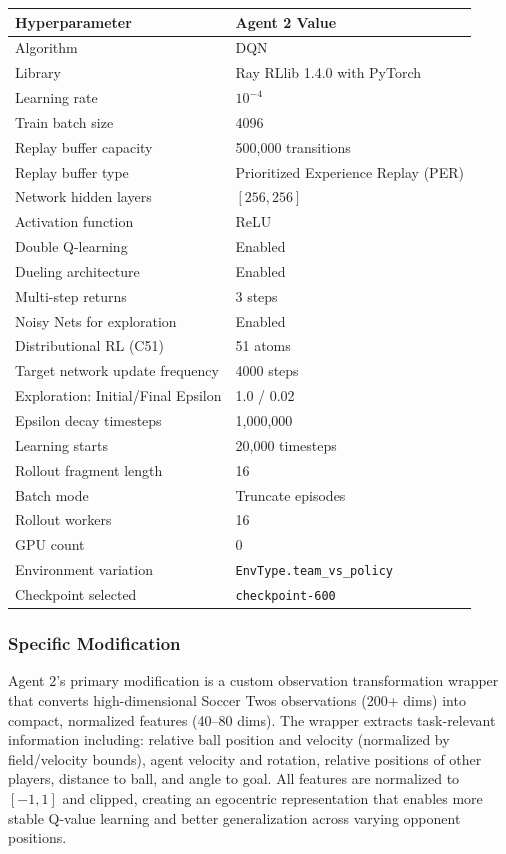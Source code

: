 \documentclass{article}
\begin{document}
\begin{center}
\begin{tabular}{|l|l|}
\hline
\textbf{Hyperparameter} & \textbf{Agent 2 Value} \\
\hline
Algorithm & DQN \\
\hline
Library & Ray RLlib 1.4.0 with PyTorch \\
\hline
Learning rate & $10^{-4}$ \\
\hline
Train batch size & 4096 \\
\hline
Replay buffer capacity & 500,000 transitions \\
\hline
Replay buffer type & Prioritized Experience Replay (PER) \\
\hline
Network hidden layers & $[256, 256]$ \\
\hline
Activation function & ReLU \\
\hline
Double Q-learning & Enabled \\
\hline
Dueling architecture & Enabled \\
\hline
Multi-step returns & 3 steps \\
\hline
Noisy Nets for exploration & Enabled \\
\hline
Distributional RL (C51) & 51 atoms \\
\hline
Target network update frequency & 4000 steps \\
\hline
Exploration: Initial/Final Epsilon & 1.0 / 0.02 \\
\hline
Epsilon decay timesteps & 1,000,000 \\
\hline
Learning starts & 20,000 timesteps \\
\hline
Rollout fragment length & 16 \\
\hline
Batch mode & Truncate episodes \\
\hline
Rollout workers & 16 \\
\hline
GPU count & 0 \\
\hline
Environment variation & \texttt{EnvType.team\_vs\_policy} \\
\hline
Checkpoint selected & \texttt{checkpoint-600} \\
\hline
\end{tabular}
\end{center}

\subsubsection{Specific Modification}

Agent 2's primary modification is a custom observation transformation wrapper that converts high-dimensional Soccer Twos observations (200+ dims) into compact, normalized features (40--80 dims). The wrapper extracts task-relevant information including: relative ball position and velocity (normalized by field/velocity bounds), agent velocity and rotation, relative positions of other players, distance to ball, and angle to goal. All features are normalized to $[-1, 1]$ and clipped, creating an egocentric representation that enables more stable Q-value learning and better generalization across varying opponent positions.
\end{document}

